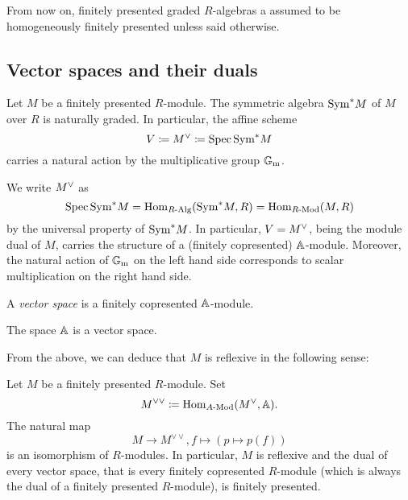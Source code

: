 From now on, finitely presented graded $R$-algebras a assumed to be
homogeneously finitely presented unless said otherwise.

\subsection{Vector spaces and their duals}

\begin{example}
  Let $M$ be a finitely presented $R$-module.  The symmetric algebra
  $\mathrm{Sym}^* M$ of $M$ over $R$ is naturally graded.  In particular, the
  affine scheme
  \begin{equation*}
    V \coloneqq M\spcheck \coloneqq \Spec \Sym^* M
  \end{equation*}
  carries a natural action by the multiplicative group $\mathbb{G}_\mathrm{m}$.
\end{example}

\begin{remark}
  We write $M\spcheck$ as
  \begin{equation*}
    \operatorname{Spec} \mathrm{Sym}^* M = \mathrm{Hom}_{R\text{-}\mathrm{Alg}}(\mathrm{Sym}^* M, R) = \mathrm{Hom}_{R\text{-}\mathrm{Mod}}(M, R)
  \end{equation*}
  by the universal property of $\mathrm{Sym}^* M$.  In particular,
  $V = M\spcheck$, being the module dual of $M$, carries the structure
  of a (finitely copresented) $\mathbb{A}$-module.  Moreover, the natural
  action of $\mathbb{G}_\mathrm{m}$ on the left hand side corresponds to scalar
  multiplication on the right hand side.
\end{remark}

\begin{definition}
  A \emph{vector space} is a finitely copresented $\mathbb{A}$-module.
\end{definition}

\begin{example}
  The space $\mathbb{A}$ is a vector space.
\end{example}

From the above, we can deduce that $M$ is reflexive in the following
sense:

\begin{theorem}
  Let $M$ be a finitely presented $R$-module.  Set
  \begin{equation*}
    M^{\vee\vee} \coloneqq \Hom_{\Mod A}(M\spcheck, \A).
  \end{equation*}
  The natural map
  \begin{equation*}
    M \to M^{\vee\vee}, f \mapsto (p \mapsto p(f))
  \end{equation*}
  is an isomorphism of $R$-modules.  In particular, $M$ is reflexive
  and the dual of every vector space, that is every finitely
  copresented $R$-module (which is always the dual of a finitely
  presented $R$-module), is finitely presented.
\end{theorem}

